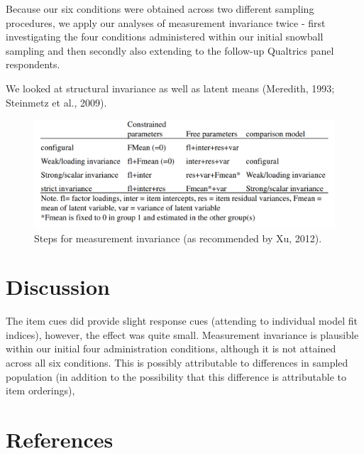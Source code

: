 \documentclass[
  man]{apa7}
\begin{document}
Because our six conditions were obtained across two different sampling procedures, we apply our analyses of measurement invariance twice - first investigating the four conditions administered within our initial snowball sampling and then secondly also extending to the follow-up Qualtrics panel respondents.

We looked at structural invariance as well as latent means (Meredith, 1993; Steinmetz et al., 2009).

\begin{figure}
\includegraphics[width=4.71in]{steps} \caption{Steps for measurement invariance (as recommended by Xu, 2012).}\label{fig:figure1}
\end{figure}

\hypertarget{discussion}{%
\section{Discussion}\label{discussion}}

The item cues did provide slight response cues (attending to individual model fit indices), however, the effect was quite small. Measurement invariance is plausible within our initial four administration conditions, although it is not attained across all six conditions. This is possibly attributable to differences in sampled population (in addition to the possibility that this difference is attributable to item orderings),

\newpage

\hypertarget{references}{%
\section{References}\label{references}}

\begingroup
\setlength{\parindent}{-0.5in}
\setlength{\leftskip}{0.5in}
\end{document}
